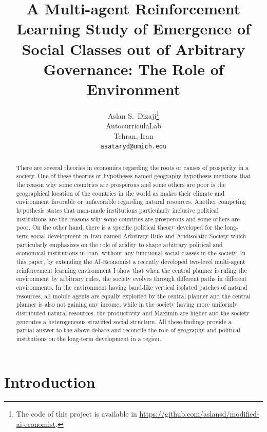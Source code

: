 \documentclass{article}
\title{A Multi-agent Reinforcement Learning Study of Emergence of Social Classes out of Arbitrary Governance: The Role of Environment}
\author{
Aslan S.~Dizaji\thanks{The code of this project is available in \url{https://github.com/aslansd/modified-ai-economist}.} \\
AutocurriculaLab\\
Tehran, Iran\\
\texttt{asataryd@umich.edu} \\
}
\begin{document}
\maketitle

\begin{abstract}
There are several theories in economics regarding the roots or causes of prosperity in a society. One of these theories or hypotheses \textendash named geography hypothesis \textendash mentions that the reason why some countries are prosperous and some others are poor is the geographical location of the countries in the world as makes their climate and environment favorable or unfavorable regarding natural resources. Another competing hypothesis states that man-made institutions particularly inclusive political institutions are the reasons why some countries are prosperous and some others are poor. On the other hand, there is a specific political theory developed for the long-term social development in Iran \textendash named Arbitrary Rule and Aridisolatic Society which particularly emphasizes on the role of aridity to shape arbitrary political and economical institutions in Iran, without any functional social classes in the society. In this paper, by extending the AI-Economist \textendash a recently developed two-level multi-agent reinforcement learning environment \textendash I show that when the central planner is ruling the environment by arbitrary rules, the society evolves through different paths in different environments. In the environment having band-like vertical isolated patches of natural resources, all mobile agents are equally exploited by the central planner and the central planner is also not gaining any income, while in the society having more uniformly distributed natural resources, the productivity and Maximin are higher and the society generates a heterogeneous stratified social structure. All these findings provide a partial answer to the above debate and reconcile the role of geography and political institutions on the long-term development in a region.
\end{abstract}

\section{Introduction}
\end{document}
